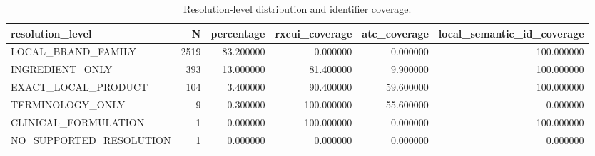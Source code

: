\begin{table}
\caption{Resolution-level distribution and identifier coverage.}
\begin{tabular}{lrrrrr}
\toprule
resolution\_level & N & percentage & rxcui\_coverage & atc\_coverage & local\_semantic\_id\_coverage \\
\midrule
LOCAL\_BRAND\_FAMILY & 2519 & 83.200000 & 0.000000 & 0.000000 & 100.000000 \\
INGREDIENT\_ONLY & 393 & 13.000000 & 81.400000 & 9.900000 & 100.000000 \\
EXACT\_LOCAL\_PRODUCT & 104 & 3.400000 & 90.400000 & 59.600000 & 100.000000 \\
TERMINOLOGY\_ONLY & 9 & 0.300000 & 100.000000 & 55.600000 & 0.000000 \\
CLINICAL\_FORMULATION & 1 & 0.000000 & 100.000000 & 0.000000 & 100.000000 \\
NO\_SUPPORTED\_RESOLUTION & 1 & 0.000000 & 0.000000 & 0.000000 & 0.000000 \\
\bottomrule
\end{tabular}
\end{table}
